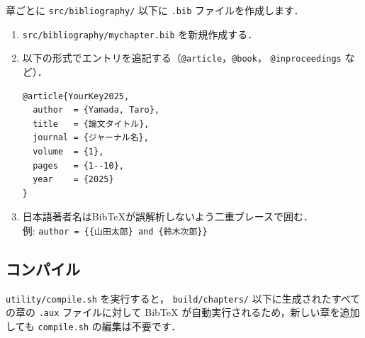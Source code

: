 章ごとに \texttt{src/bibliography/} 以下に \texttt{.bib} ファイルを作成します．

\begin{enumerate}
  \item \texttt{src/bibliography/mychapter.bib} を新規作成する．
  \item 以下の形式でエントリを追記する（\texttt{@article}，\texttt{@book}，
        \texttt{@inproceedings} など）．
        \begin{verbatim}
@article{YourKey2025,
  author  = {Yamada, Taro},
  title   = {論文タイトル},
  journal = {ジャーナル名},
  volume  = {1},
  pages   = {1--10},
  year    = {2025}
}
        \end{verbatim}
  \item 日本語著者名はBibTeXが誤解析しないよう二重ブレースで囲む．\\
        例: \verb|author = {{山田太郎} and {鈴木次郎}}|
\end{enumerate}

\subsection{コンパイル}

\texttt{utility/compile.sh} を実行すると，
\texttt{build/chapters/} 以下に生成されたすべての章の \texttt{.aux} ファイルに対して
BibTeX が自動実行されるため，新しい章を追加しても \texttt{compile.sh} の編集は不要です．



